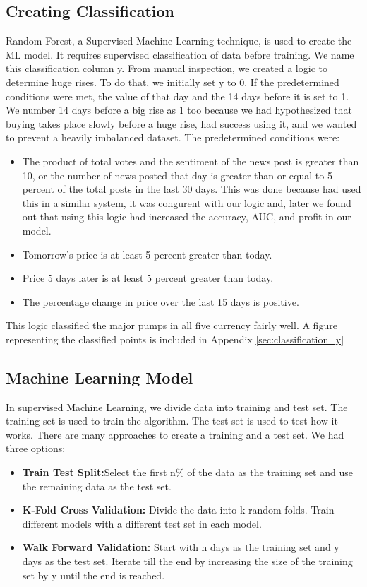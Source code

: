 \documentclass[letterpaper]{article}
\begin{document}
\subsection{Creating Classification}
\label{sec:creating_y}
Random Forest, a Supervised Machine Learning technique, is used to create the ML model. It requires 
supervised classification of data before training. We name this classification column y. From manual 
inspection, we created a logic to determine huge rises.
To do that, we initially set y to 0. If the predetermined conditions were met, the value of that day and the 14 
days before it is set to 1. We number 14 days before a big rise as 1 too because 
we had hypothesized that buying takes place slowly before a huge rise, \cite{donoho2004early} had 
success using it, and we wanted to prevent a heavily imbalanced dataset. The predetermined 
conditions were:
\begin{itemize}
    \item The product of total votes and the sentiment of the news post is greater than 10, or
    the number of news posted that day is greater than or equal to 5 percent of the total posts in the last 
    30 days. This was done because \cite{donoho2004early} had used this in a similar system, it was congurent
    with our logic and, later we found out that using this logic had increased the accuracy, AUC, and profit in our 
    model.
    \item Tomorrow's price is at least 5 percent greater than today.
    \item Price 5 days later is at least 5 percent greater than today. 
    \item The percentage change in price over the last 15 days is positive.
\end{itemize}
    
This logic classified the major pumps in all five currency fairly well. A figure representing the classified 
points is included in Appendix \ref{sec:classification_y}

\subsection{Machine Learning Model}
\label{sec:model_creation}
In supervised Machine Learning, we divide data into training and test set. The training set is used to train the 
algorithm. The test set is used to test how it works. There are many approaches to create a training and a test set.
We had three options:
\begin{itemize}
    \item \textbf{Train Test Split:}Select the first n\% of the data as the training set and use the remaining data as 
   the test set. 
    \item \textbf{K-Fold Cross Validation:} Divide the data into k random folds. Train different models with 
    a different test set in each model.
    \item \textbf{Walk Forward Validation:} Start with n days as the training set and y days as the test set.
    Iterate till the end by increasing the size of the training set by y until the end is reached.
\end{itemize}
   
\end{document}

